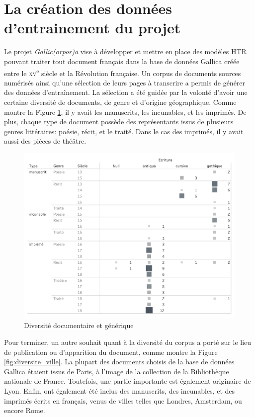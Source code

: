 \documentclass[class=article, crop=false]{standalone}
\begin{document}
\section{La création des données d'entrainement du projet}
\label{veritesDeTerrain}
Le projet \textit{Gallic(orpor)a} vise à développer et mettre en place des modèles \acrshort{HTR} pouvant traiter tout document français dans la base de données Gallica créée entre le \textsc{xv}\textsuperscript{e} siècle et la Révolution française. Un corpus de documents sources numérisés ainsi qu'une sélection de leurs pages à transcrire a permis de générer des données d'entraînement. La sélection a été guidée par la volonté d'avoir une certaine diversité de documents, de genre et d'origine géographique. Comme montre la Figure \ref{fig:diversite_genre}, il y avait les manuscrits, les incunables, et les imprimés. De plus, chaque type de document possède des représentants issus de plusieurs genres littéraires: poésie, récit, et le traité. Dans le cas des imprimés, il y avait aussi des pièces de théâtre.

\begin{figure}[hbt!]
\includegraphics[width=\textwidth]{../../../images/diversite_genre.png}
\caption{Diversité documentaire et générique}
\label{fig:diversite_genre}
\end{figure} 

Pour terminer, un autre souhait quant à la diversité du corpus a porté sur le lieu de publication ou d'apparition du document, comme montre la Figure \ref{fig:diversite_ville}. La plupart des documents choisis de la base de données Gallica étaient issus de Paris, à l'image de la collection de la Bibliothèque nationale de France. Toutefois, une partie importante est également originaire de Lyon. Enfin, ont également été inclus des manuscrits, des incunables, et des imprimés écrits en français, venus de villes telles que Londres, Amsterdam, ou encore Rome.
\end{document}
